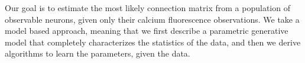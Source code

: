 Our goal is to estimate the most likely connection matrix from a population of observable neurons, given only their calcium fluorescence observations.  We take a model based approach, meaning that we first describe a parametric generative model that completely characterizes the statistics of the data, and then we derive algorithms to learn the parameters, given the data.  

% 
% 
